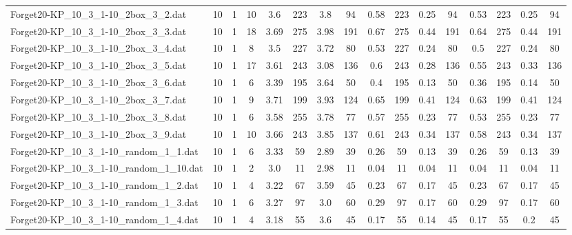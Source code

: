 \begin{sidewaystable}[!ht]
{\begin{tabular}{lccccccccccccccc}
Forget20-KP\_10\_3\_1-10\_2box\_3\_2.dat & 10 & 1 & 10 & 3.6 & 223 & 3.8 & 94 & 0.58 & 223 &  \textcolor{blue2}{0.25} & 94 & 0.53 & 223 &  \textcolor{blue2}{0.25} & 94 \\
Forget20-KP\_10\_3\_1-10\_2box\_3\_3.dat & 10 & 1 & 18 & 3.69 & 275 & 3.98 & 191 & 0.67 & 275 & 0.44 & 191 & 0.64 & 275 & 0.44 & 191 \\
Forget20-KP\_10\_3\_1-10\_2box\_3\_4.dat & 10 & 1 & 8 & 3.5 & 227 & 3.72 & 80 & 0.53 & 227 &  \textcolor{blue2}{0.24} & 80 & 0.5 & 227 &  \textcolor{blue2}{0.24} & 80 \\
Forget20-KP\_10\_3\_1-10\_2box\_3\_5.dat & 10 & 1 & 17 & 3.61 & 243 & 3.08 & 136 & 0.6 & 243 &  \textcolor{blue2}{0.28} & 136 & 0.55 & 243 & 0.33 & 136 \\
Forget20-KP\_10\_3\_1-10\_2box\_3\_6.dat & 10 & 1 & 6 & 3.39 & 195 & 3.64 & 50 & 0.4 & 195 &  \textcolor{blue2}{0.13} & 50 & 0.36 & 195 & 0.14 & 50 \\
Forget20-KP\_10\_3\_1-10\_2box\_3\_7.dat & 10 & 1 & 9 & 3.71 & 199 & 3.93 & 124 & 0.65 & 199 &  \textcolor{blue2}{0.41} & 124 & 0.63 & 199 &  \textcolor{blue2}{0.41} & 124 \\
Forget20-KP\_10\_3\_1-10\_2box\_3\_8.dat & 10 & 1 & 6 & 3.58 & 255 & 3.78 & 77 & 0.57 & 255 &  \textcolor{blue2}{0.23} & 77 & 0.53 & 255 &  \textcolor{blue2}{0.23} & 77 \\
Forget20-KP\_10\_3\_1-10\_2box\_3\_9.dat & 10 & 1 & 10 & 3.66 & 243 & 3.85 & 137 & 0.61 & 243 &  \textcolor{blue2}{0.34} & 137 & 0.58 & 243 &  \textcolor{blue2}{0.34} & 137 \\
Forget20-KP\_10\_3\_1-10\_random\_1\_1.dat & 10 & 1 & 6 & 3.33 & 59 & 2.89 & 39 & 0.26 & 59 &  \textcolor{blue2}{0.13} & 39 & 0.26 & 59 &  \textcolor{blue2}{0.13} & 39 \\
Forget20-KP\_10\_3\_1-10\_random\_1\_10.dat & 10 & 1 & 2 & 3.0 & 11 & 2.98 & 11 &  \textcolor{blue2}{0.04} & 11 &  \textcolor{blue2}{0.04} & 11 &  \textcolor{blue2}{0.04} & 11 &  \textcolor{blue2}{0.04} & 11 \\
Forget20-KP\_10\_3\_1-10\_random\_1\_2.dat & 10 & 1 & 4 & 3.22 & 67 & 3.59 & 45 & 0.23 & 67 &  \textcolor{blue2}{0.17} & 45 & 0.23 & 67 &  \textcolor{blue2}{0.17} & 45 \\
Forget20-KP\_10\_3\_1-10\_random\_1\_3.dat & 10 & 1 & 6 & 3.27 & 97 & 3.0 & 60 & 0.29 & 97 &  \textcolor{blue2}{0.17} & 60 & 0.29 & 97 &  \textcolor{blue2}{0.17} & 60 \\
Forget20-KP\_10\_3\_1-10\_random\_1\_4.dat & 10 & 1 & 4 & 3.18 & 55 & 3.6 & 45 & 0.17 & 55 & 0.14 & 45 & 0.17 & 55 & 0.2 & 45 \\

\end{tabular}}
\end{sidewaystable}
